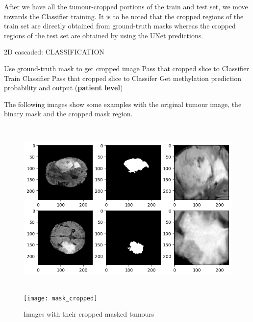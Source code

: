 After we have all the tumour-cropped portions of the train and test set, we move towards the Classifier training. It is to be noted that the cropped regions of the train set are directly obtained from ground-truth masks whereas the cropped regions of the test set are obtained by using the UNet predictions.
\begin{algorithm}[H]
\caption{2D cascaded: CLASSIFICATION}\label{alg:2D_cascaded_2}
\begin{algorithmic}[1]
\vspace*{4mm}
        \State Use ground-truth mask to get cropped image
        \State Pass that cropped slice to Classifier
        \State Train Classifier
\EndFor
\State
{}
    \State Pass that cropped slice to Classifer
    \State Get methylation prediction probability and output (\textbf{patient level})
\EndFor

\end{algorithmic}
\end{algorithm}

The following images show some examples with the original tumour image, the binary mask and the cropped mask region. 

\begin{figure}[H]
  \begin{center}
    \leavevmode
    \ifpdf
      \includegraphics[height=3.5in]{Methodology/Chapter3Figs/mask_cropped.png}
    \else
      \texttt{[image: mask\_cropped]}
    \fi
    \caption{Images with their cropped masked tumours}
    \label{mask_cropped}
  \end{center}
\end{figure}

